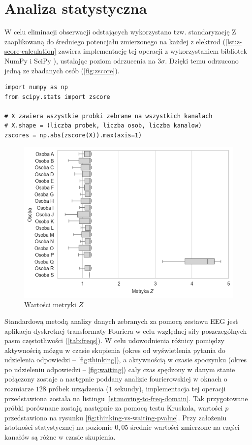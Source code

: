 \documentclass{./assets/wfis}
\begin{document}

\section{Analiza statystyczna}\label{analiza-klasyczna}
W celu eliminacji obserwacji odstających wykorzystano tzw. standaryzację Z zaaplikowaną do średniego potencjału zmierzonego na każdej z elektrod (\autoref{lst:z-score-calculation} zawiera implementację tej operacji z wykorzystaniem bibliotek NumPy \cite{harris_array_2020} i SciPy \cite{virtanen_scipy_2020}), ustalając poziom odrzucenia na $3\sigma$. Dzięki temu odrzucono jedną ze zbadanych osób (\autoref{fig:zscore}).

\begin{lstlisting}[caption={Obliczanie standardyzacji Z},label={lst:z-score-calculation}]
import numpy as np
from scipy.stats import zscore

# X zawiera wszystkie probki zebrane na wszystkich kanalach
# X.shape = (liczba probek, liczba osob, liczba kanalow)
zscores = np.abs(zscore(X)).max(axis=1)
\end{lstlisting}

\begin{figure}[h!]
    \centering
    \includegraphics[width=0.75\columnwidth]{thesis/assets/zscore.png}
    \caption{Wartości metryki $Z$}
    \label{fig:zscore}
\end{figure}


Standardową metodą analizy danych zebranych za pomocą zestawu EEG jest aplikacja dyskretnej transformaty Fouriera w celu względnej siły poszczególnych pasm częstotliwości (\autoref{tab:freqs}). W celu udowodnienia różnicy pomiędzy aktywnością mózgu w czasie skupienia (okres od wyświetlenia pytania do udzielenia odpowiedzi – \autoref{fig:thinking}), a aktywnością w czasie spoczynku (okres po udzieleniu odpowiedzi – \autoref{fig:waiting}) cały czas spędzony w danym stanie połączony zostaje a następnie poddany analizie fourierowskiej w oknach o rozmiarze $128$ próbek urządzenia ($1$ sekundy), implementacja tej operacji przedstawiona została na listingu \ref{lst:moving-to-freq-domain}. Tak przygotowane próbki porównane zostają następnie za pomocą testu Kruskala, wartości $p$ przedstawiono na rysunku \ref{fig:thinking-vs-waiting-pvalue}. Przy założeniu istotności statystycznej na poziomie $0,05$ średnie wartości zmierzone na części kanałów są różne w czasie skupienia.
\end{document}
